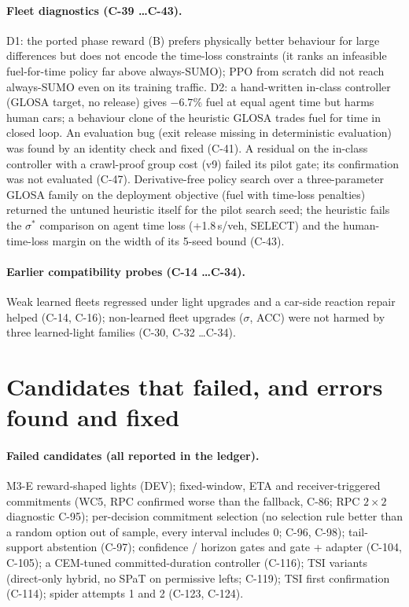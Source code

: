 \documentclass[11pt]{article}
\begin{document}
\paragraph{Fleet diagnostics (C-39 \dots C-43).} D1: the ported phase reward (B) prefers physically better behaviour for large
differences but does not encode the time-loss constraints (it ranks an infeasible fuel-for-time policy far above always-SUMO); PPO from
scratch did not reach always-SUMO even on its training traffic. D2: a hand-written in-class controller (GLOSA target, no release) gives
$-6.7\%$ fuel at equal agent time but harms human cars; a behaviour clone of the heuristic GLOSA trades fuel for time in closed loop.
An evaluation bug (exit release missing in deterministic evaluation) was found by an identity check and fixed (C-41).
A residual on the in-class controller with a crawl-proof group cost (v9) failed its pilot gate; its confirmation was not evaluated (C-47).
Derivative-free policy search over a three-parameter GLOSA family on the deployment objective (fuel with time-loss penalties) returned
the untuned heuristic itself for the pilot search seed; the heuristic fails the $\sigma^*$ comparison on agent time loss (+1.8\,s/veh,
SELECT) and the human-time-loss margin on the width of its 5-seed bound (C-43).
\paragraph{Earlier compatibility probes (C-14 \dots C-34).} Weak learned fleets regressed under light upgrades and a car-side reaction repair
helped (C-14, C-16); non-learned fleet upgrades ($\sigma$, ACC) were not harmed by three learned-light families (C-30, C-32 \dots C-34).

\section{Candidates that failed, and errors found and fixed}
\paragraph{Failed candidates (all reported in the ledger).} M3-E reward-shaped lights (DEV); fixed-window, ETA and receiver-triggered
commitments (WC5, RPC confirmed worse than the fallback, C-86; RPC $2\times2$ diagnostic C-95); per-decision commitment selection (no
selection rule better than a random option out of sample, every interval includes 0; C-96, C-98); tail-support abstention (C-97);
confidence / horizon gates and gate + adapter (C-104, C-105); a CEM-tuned
committed-duration controller (C-116); TSI variants (direct-only hybrid, no SPaT on permissive lefts; C-119); TSI first confirmation
(C-114); spider attempts 1 and 2 (C-123, C-124).
\end{document}
